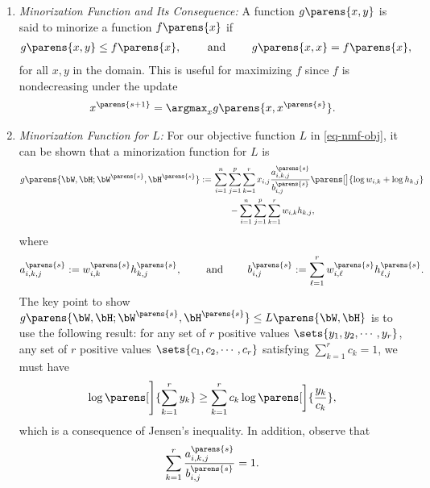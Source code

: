 \documentclass[12pt]{article}
\begin{document}
\begin{enumerate}[label=\textbf{\arabic*.}]
	\begin{enumerate}
		\item \textit{Minorization Function and Its Consequence:} A function $g \parens{x, y}$ is said to minorize a function $f \parens{x}$ if 
		\begin{align*}
			g \parens{x, y} \le f \parens{x}, \qquad \text{ and } \qquad g \parens{x, x} = f \parens{x}, 
		\end{align*}
		for all $x, y$ in the domain. This is useful for maximizing $f$ since $f$ is nondecreasing under the update 
		\begin{align*}
			x^{\parens{s+1}} = \argmax_x g \parens{x, x^{\parens{s}}}. 
		\end{align*}
		
		\item \textit{Minorization Function for $L$:} For our objective function $L$ in \eqref{eq-nmf-obj}, it can be shown that a minorization function for $L$ is 
		\begin{align}
			g \parens{\bW, \bH; \bW^{\parens{s}}, \bH^{\parens{s}}} := & \, \sum_{i=1}^n \sum_{j=1}^p \sum_{k=1}^r x_{i,j} \frac{a_{i,k,j}^{\parens{s}}}{b_{i,j}^{\parens{s}}} \parens[\big]{\log w_{i,k} + \log h_{k,j}} \nonumber \\ 
			& \qquad - \sum_{i=1}^n \sum_{j=1}^p \sum_{k=1}^r w_{i,k} h_{k,j}, \label{eq-nmf-surrogate}
		\end{align}
		where 
		\begin{align*}
			a_{i,k,j}^{\parens{s}} := w_{i,k}^{\parens{s}} h_{k,j}^{\parens{s}}, \qquad \text{ and } \qquad b_{i,j}^{\parens{s}} := \sum_{\ell=1}^r w_{i, \ell}^{\parens{s}} h_{\ell,j}^{\parens{s}}. 
		\end{align*}
		The key point to show $g \parens{\bW, \bH; \bW^{\parens{s}}, \bH^{\parens{s}}} \le L \parens{\bW, \bH}$ is to use the following result: for any set of $r$ positive values $\sets{y_1, y_2, \cdots, y_r}$, any set of $r$ positive values $\sets{c_1, c_2, \cdots, c_r}$ satisfying $\sum_{k=1}^r c_k = 1$, we must have 
		\begin{align*}
			\log \parens[\Bigg]{\sum_{k=1}^r y_k} \ge \sum_{k=1}^r c_k \log \parens[\bigg]{\frac{y_k}{c_k}}, 
		\end{align*}
		which is a consequence of Jensen's inequality. In addition, observe that 
		\begin{align*}
			\sum_{k=1}^r \frac{a_{i,k,j}^{\parens{s}}}{b_{i,j}^{\parens{s}}} = 1. 
		\end{align*}
		

\end{enumerate}
\end{enumerate}
\end{document}
